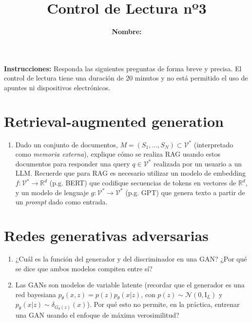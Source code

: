 \documentclass{article}
\title{\bfseries{Control de Lectura nº3}\vspace{0.5cm}}
\author{\textbf{Nombre:} \rule{12cm}{0.4pt}}
\newcommand{\R}{\mathbb{R}}
\begin{document}
\maketitle

\hspace{-0.5cm}\textbf{Instrucciones:} Responda las siguientes preguntas de forma breve y precisa. El control de lectura tiene una duración de 20 minutos y no está permitido el uso de apuntes ni dispositivos electrónicos.

\section*{Retrieval-augmented generation}
\begin{enumerate}[{\bf P1.}]
	\item Dado un conjunto de documentos, $M=(S_1,\ldots,S_N)\subset\mathcal{V}^*$ (interpretado como \textit{memoria externa}), explique cómo se realiza RAG usando estos documentos para responder una query $q\in\mathcal{V}^*$ realizada por un usuario a un LLM. Recuerde que para RAG es necesario utilizar un modelo de embedding $f:\mathcal{V}^*\to\R^d$ (p.g. BERT) que codifique secuencias de tokens en vectores de $\R^d$, y un modelo de lenguaje $g:\mathcal{V}^*\to\mathcal{V}^*$ (p.g. GPT) que genera texto a partir de un \textit{prompt} dado como entrada.
\end{enumerate}

\section*{Redes generativas adversarias}
\begin{enumerate}[{\bf P1.}]
	\item ¿Cuál es la función del generador y del discriminador en una GAN? ¿Por qué se dice que ambos modelos compiten entre sí?
	\item Las GANs son modelos de variable latente (recordar que el generador es una red bayesiana $p_\theta(x,z)=p(z)p_\theta(x|z)$, con $p(z)\sim\mathcal{N}{(0,\text{I}_L)}$ y $p_\theta(x|z)\sim\delta_{G_\theta(z)}(x)$). Por qué esto no permite, en la práctica, entrenar una GAN usando el enfoque de máxima verosimilitud?
\end{enumerate}
\end{document}
